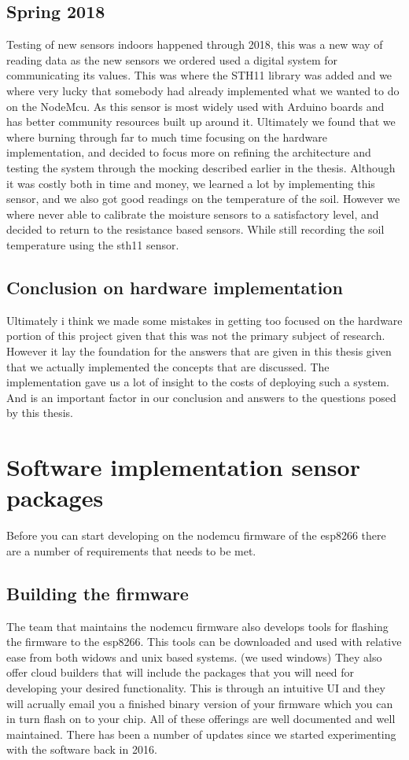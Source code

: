 \documentclass[]{uiophd}
\begin{document}
\subsection{Spring 2018}
Testing of new sensors indoors happened through 2018, this was a new way of reading data as the new sensors we ordered used a digital system for communicating its values. This was where the STH11 library was added and we where very lucky that somebody had already implemented what we wanted to do on the NodeMcu. As this sensor is most widely used with Arduino boards and has better community resources built up around it. Ultimately we found that we where burning through far to much time focusing on the hardware implementation, and decided to focus more on refining the architecture and testing the system through the mocking described earlier in the thesis. Although it was costly both in time and money, we learned a lot by implementing this sensor, and we also got good readings on the temperature of the soil. However we where never able to calibrate the moisture sensors to a satisfactory level, and decided to return to the resistance based sensors. While still recording the soil temperature using the sth11 sensor. 
\subsection{Conclusion on hardware implementation}
Ultimately i think we made some mistakes in getting too focused on the hardware portion of this project given that this was not the primary subject of research. However it lay the foundation for the answers that are given in this thesis given that we actually implemented the concepts that are discussed. The implementation gave us a lot of insight to the costs of deploying such a system. And is an important factor in our conclusion and answers to the questions posed by this thesis.
\section{Software implementation sensor packages}
Before you can start developing on the nodemcu firmware of the esp8266 there are a number of requirements that needs to be met.
\subsection{Building the firmware}
The team that maintains the nodemcu firmware also develops tools for flashing the firmware to the esp8266. This tools can be downloaded and used with relative ease from both widows and unix based systems. (we used windows) They also offer cloud builders that will include the packages that you will need for developing your desired functionality. This is through an intuitive UI and they will acrually email you a finished binary version of your firmware which you can in turn flash on to your chip. All of these offerings are well documented and well maintained. There has been a number of updates since we started experimenting with the software back in 2016.
\end{document}
